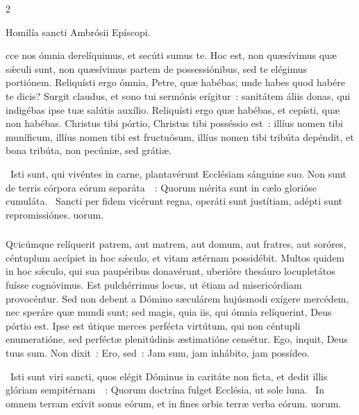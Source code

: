 \documentclass[9pt,twoside]{extarticle}
\begin{document}
\begin{multicols}{2}
{{\begin{center}Homilía sancti Ambrósii Epíscopi.\\
\end{center}
cce nos ómnia derelíquimus, et secúti sumus te. Hoc est, non quæsívimus quæ sǽculi sunt, non quæsívimus partem de possessiónibus, sed te elégimus portiónem. Reliquísti ergo ómnia, Petre, quæ habébas; unde habes quod habére te dicis? Surgit claudus, et sono tui sermónis erígitur~: sanitátem áliis donas, qui indigébas ipse tuæ salútis auxílio. Reliquísti ergo quæ habébas, et cepísti, quæ non habébas. Christus tibi pórtio, Christus tibi posséssio est~: illíus nomen tibi muníficum, illíus nomen tibi est fructuósum, illíus nomen tibi tribúta depéndit, et bona tribúta, non pecúniæ, sed grátiæ.

\begin{tightlist}{}
\item {}~Isti sunt, qui vivéntes in carne, plantavérunt Ecclésiam sánguine suo. Non sunt de terris córpora eórum separáta~~: \textred{*} Quorum mérita sunt in cælo glorióse cumuláta. ~Sancti per fidem vicérunt regna, operáti sunt justítiam, adépti sunt repromissiónes. uorum.
\end{tightlist}

\subsubsection*{\center {}}
\lettrine{Q}uicúmque relíquerit patrem, aut matrem, aut domum, aut fratres, aut soróres, céntuplum accípiet in hoc sǽculo, et vitam ætérnam possidébit. Multos quidem in hoc sǽculo, qui sua paupéribus donavérunt, uberióre thesáuro locupletátos fuísse cognóvimus. Est pulchérrimus locus, ut étiam ad misericórdiam provocéntur. Sed non debent a Dómino sæculárem hujúsmodi exígere mercédem, nec speráre quæ mundi sunt; sed magis, quia iis, qui ómnia relíquerint, Deus pórtio est. Ipse est útique merces perfécta virtútum, qui non céntupli enumeratióne, sed perféctæ plenitúdinis æstimatióne censétur. Ego, inquit, Deus tuus sum. Non dixit~: Ero, sed~: Jam sum, jam inhábito, jam possídeo.

\begin{tightlist}{}
\item {}~Isti sunt viri sancti, quos elégit Dóminus in caritáte non ficta, et dedit illis glóriam sempitérnam~~: \textred{*} Quorum doctrína fulget Ecclésia, ut sole luna. ~In omnem terram exívit sonus eórum, et in fines orbis terræ verba eórum. uorum.
\end{tightlist}

}}
\end{multicols}
\end{document}
